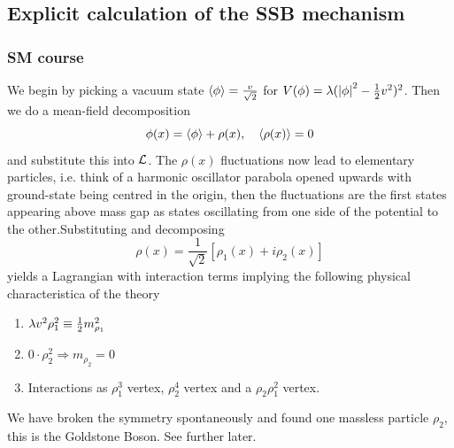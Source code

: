 \subsection{Explicit calculation of the SSB mechanism }
\subsubsection{SM course}
We begin by picking a vacuum state $\expval{\phi} = \frac{v}{\sqrt{2}}$ for $V(\phi) = \lambda (\abs{\phi}^2- \frac{1}{2} v^2)^2$. Then we do a mean-field decomposition
\begin{equation}
	\phi(x) = \expval{\phi} + \rho(x), \quad \expval{\rho(x)}=0
\end{equation}
and substitute this into $\mathcal{L}$. The $\rho(x)$ fluctuations now lead to elementary particles, i.e. think of a harmonic oscillator parabola opened upwards with ground-state being centred in the origin, then the fluctuations are the first states appearing above mass gap as states oscillating from one side of the potential to the other.Substituting and decomposing
\begin{equation}
	\rho(x) = \frac{1}{\sqrt{2}} \left[\rho_1(x) + i \rho_2(x)\right]
\end{equation}
yields a Lagrangian with interaction terms implying the following physical characteristica of the theory
\begin{enumerate}
	\item $\lambda v^2 \rho^2_1 \equiv \frac{1}{2} m^2_{\rho_1}$
	\item $0 \cdot \rho^2_2 \Rightarrow m_{\rho_2}=0$
	\item Interactions as $\rho^3_1$ vertex, $\rho^4_2$ vertex and a $\rho_2 \rho^2_1$ vertex.
\end{enumerate}
We have broken the symmetry spontaneously and found one massless particle $\rho_2$, this is the Goldstone Boson. See further later.
